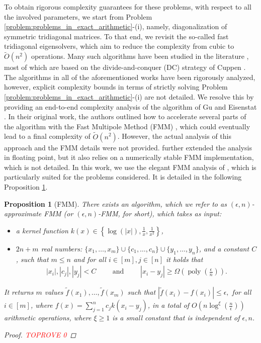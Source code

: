 \documentclass{article}
\newcommand{\labs}{\left|}
\newcommand{\rabs}{\right|}
\newcommand{\lcurly}{\left\{}
\newcommand{\rcurly}{\right\}}
\newcommand{\lpar}{\left(}
\newcommand{\rpar}{\right)}
\newtheorem{proposition}{Proposition}[section]
\DeclareMathOperator{\poly}{poly}
\newcommand{\cfmm}{\xi}
\newcommand{\fmmalgo}{FMM} \usepackage[utf8]{inputenc}
\begin{document}
    To obtain rigorous complexity guarantees for these problems, with respect to all the involved parameters, we start from Problem \ref{problem:problems_in_exact_arithmetic}-(i), namely, diagonalization of symmetric tridiagonal matrices. To that end, we revisit the so-called fast tridiagonal eigensolvers, which aim to reduce the complexity from cubic to $\widetilde O(n^2)$ operations. 
    Many such algorithms have been studied in the literature \cite{dongarra1987fully,dhillon1997new,bini1992practical,bini1991parallel,gill1990n,vogel2016superfast,ou2022superdc,stor2015accurate,barlow1993error}, most of which are based on the divide-and-conquer (DC) strategy of Cuppen \cite{cuppen1980divide}. 
    The algorithms in all of the aforementioned works have been rigorously analyzed, however, explicit complexity bounds in terms of strictly solving Problem \ref{problem:problems_in_exact_arithmetic}-(i) are not detailed. 
    We resolve this by providing an end-to-end complexity analysis of the algorithm of Gu and Eisenstat \cite{gu1995divide}. In their original work, the authors outlined how to accelerate several parts of the algorithm with the Fast Multipole Method (FMM) \cite{rokhlin1985rapid}, which could eventually lead to a final complexity of $\widetilde O(n^2)$. However, the actual analysis of this approach and the FMM details were not provided. 
    \cite{musco2018stability} further extended the analysis in floating point, but it also relies on a numerically stable FMM implementation, which is not detailed. In this work, we use the elegant FMM analysis of \cite{gu1993stable,livne2002n,cai2020stable}, which is particularly suited for the problems considered.
    It is detailed in the following Proposition \ref{proposition:fmm}. \begin{proposition}[FMM]
    \label{proposition:fmm}
    There exists an algorithm, which we refer to as $(\epsilon,n)$-approximate FMM (or $(\epsilon,n)$-\fmmalgo, for short), which takes as input:
    \begin{itemize}
        \item a kernel function $k(x)\in\lcurly \log(|x|), \frac{1}{x}, \frac{1}{x^2} \rcurly$,
        \item $2n+m$ real numbers: $\{x_1,\ldots,x_m\}\cup \{c_1,\ldots,c_n\}\cup\{y_1,\ldots,y_n\}$, and a constant $C$, such that $m\leq n$ and for all $i\in[m],j\in[n]$ it holds that
        \begin{align*}
            |x_i|,|c_j|,|y_j|<C
            \qquad
            \text{ and }
            \qquad
            |x_i-y_j|\geq \Omega(\poly(\tfrac{\epsilon}{n})).
        \end{align*}
    \end{itemize}
    It returns $m$ values $\widetilde f(x_1),\ldots,\widetilde f(x_m)$ such that
    $
        \labs
            \widetilde f(x_i)-f(x_i)
        \rabs
        \leq \epsilon,
    $
    for all $i\in[m]$, where $f(x) = \sum_{j=1}^n c_j k(x_i-y_j)$,
    in a total of $O\lpar 
        n\log^{\cfmm}(\tfrac{n}{\epsilon})
    \rpar$ arithmetic operations, where $\cfmm\geq 1$ is a small constant that is independent of $\epsilon,n$.
    \begin{proof}\textcolor{red}{TOPROVE 0}\end{proof}
\end{proposition}
\end{document}
